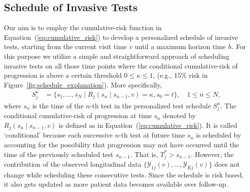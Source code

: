 \subsection{Schedule of Invasive Tests}
\label{subsec:pers_schedule}
Our aim is to employ the cumulative-risk function in Equation~(\ref{eq:cumulative_risk}) to develop a personalized schedule of invasive tests, starting from the current visit time $v$ until a maximum horizon time $h$. For this purpose we utilize a simple and straightforward approach of scheduling invasive tests on all those time points where the conditional cumulative-risk of progression is above a certain threshold $0 \leq \kappa \leq 1$, (e.g., 15\% risk in Figure~\ref{fig:schedule_explanation}). More specifically,
\begin{equation}
\label{eq:personalized_schedule}
\begin{split}
S_j^{\kappa} &= \big\{s_1, \ldots, s_{N} \mid R_j(s_n \mid s_{n-1}, v) = \kappa, s_0 = t \big\}, \quad 1 \leq n \leq N,
\end{split}
\end{equation}
where $s_n$ is the time of the ${n\mbox{-th}}$ test in the personalized test schedule $S_j^{\kappa}$. The conditional cumulative-risk of progression at time $s_n$ denoted by $R_j(s_n \mid s_{n-1}, v)$ is defined as in Equation~(\ref{eq:cumulative_risk}). It is called `conditional' because each successive ${n\mbox{-th}}$ test at future time $s_{n}$ is scheduled by accounting for the possibility that progression may not have occurred until the time of the previously scheduled test $s_{n-1}$. That is, $T^*_j > s_{n-1}$. However, the contribution of the observed longitudinal data $\{\mathcal{Y}_{1j}(v), \ldots, \mathcal{Y}_{Kj}(v)\}$ does not change while scheduling these consecutive tests. Since the schedule is risk based, it also gets updated as more patient data becomes available over follow-up.

